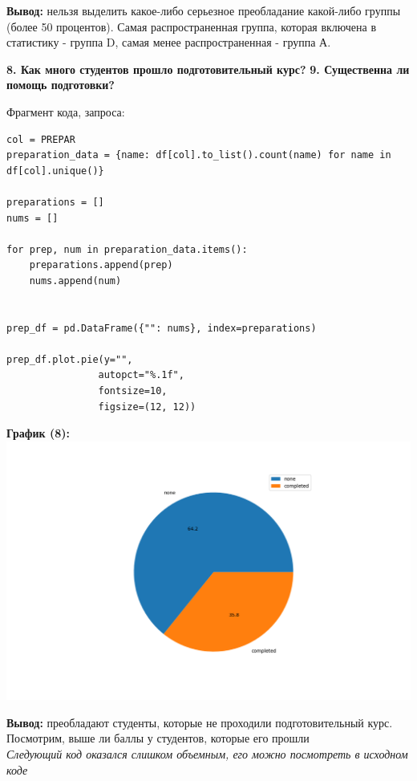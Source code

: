 \documentclass[12pt,a4paper]{article}
\begin{document}
\large \textbf{Вывод:} нельзя выделить какое-либо серьезное преобладание какой-либо группы (более 50 процентов). Самая распространенная группа, которая включена в статистику - группа D, самая менее распространенная - группа А.

\textbf{8. Как много студентов прошло подготовительный курс?}
\textbf{9. Существенна ли помощь подготовки?}


Фрагмент кода, запроса:
\begin{verbatim}
col = PREPAR
preparation_data = {name: df[col].to_list().count(name) for name in df[col].unique()}

preparations = []
nums = []

for prep, num in preparation_data.items():
    preparations.append(prep)
    nums.append(num)


prep_df = pd.DataFrame({"": nums}, index=preparations)

prep_df.plot.pie(y="",
                autopct="%.1f",
                fontsize=10,
                figsize=(12, 12))

\end{verbatim}
\textbf{График (8):}\\
\includegraphics[scale=0.7]{preparation.png} 

\large \textbf{Вывод:} преобладают студенты, которые не проходили подготовительный курс. Посмотрим, выше ли баллы у студентов, которые его прошли\\

\textit{Следующий код оказался слишком объемным, его можно посмотреть в исходном коде}
\end{document}
